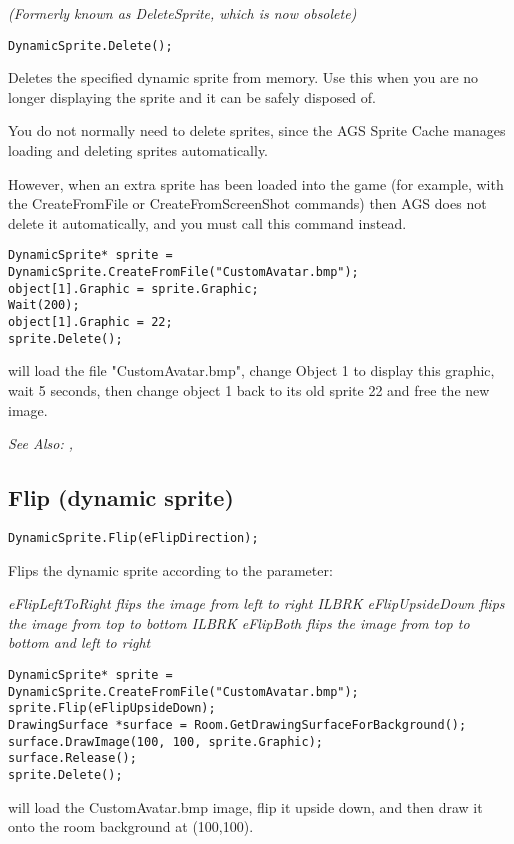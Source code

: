 \it{(Formerly known as DeleteSprite, which is now obsolete)}

\begin{verbatim}
DynamicSprite.Delete();
\end{verbatim}
Deletes the specified dynamic sprite from memory. Use this when you are no longer displaying
the sprite and it can be safely disposed of.

You do not normally need to delete sprites, since the AGS Sprite Cache manages loading
and deleting sprites automatically.

However, when an extra sprite has been loaded into the game (for example, with the
CreateFromFile or CreateFromScreenShot commands) then AGS does not delete it automatically,
and you must call this command instead.

\begin{verbatim}
DynamicSprite* sprite = DynamicSprite.CreateFromFile("CustomAvatar.bmp");
object[1].Graphic = sprite.Graphic;
Wait(200);
object[1].Graphic = 22;
sprite.Delete();
\end{verbatim}
will load the file "CustomAvatar.bmp", change Object 1 to display this graphic, wait 5
seconds, then change object 1 back to its old sprite 22 and free the new image.

\it{See Also:} ,


\subsection{Flip (dynamic sprite)}\label{DynamicSprite.Flip}%

\begin{verbatim}
DynamicSprite.Flip(eFlipDirection);
\end{verbatim}
Flips the dynamic sprite according to the parameter:

\it{eFlipLeftToRight} flips the image from left to right ILBRK
\it{eFlipUpsideDown} flips the image from top to bottom ILBRK
\it{eFlipBoth} flips the image from top to bottom and left to right

\begin{verbatim}
DynamicSprite* sprite = DynamicSprite.CreateFromFile("CustomAvatar.bmp");
sprite.Flip(eFlipUpsideDown);
DrawingSurface *surface = Room.GetDrawingSurfaceForBackground();
surface.DrawImage(100, 100, sprite.Graphic);
surface.Release();
sprite.Delete();
\end{verbatim}
will load the CustomAvatar.bmp image, flip it upside down, and then
draw it onto the room background at (100,100).


